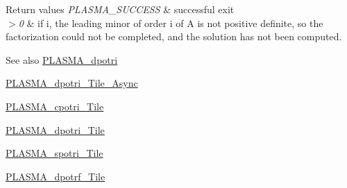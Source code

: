 \begin{DoxyRetVals}{Return values}
{\em P\+L\+A\+S\+M\+A\+\_\+\+S\+U\+C\+C\+E\+S\+S} & successful exit \\
\hline
{\em $>$0} & if i, the leading minor of order i of A is not positive definite, so the factorization could not be completed, and the solution has not been computed.\\
\hline
\end{DoxyRetVals}
\begin{DoxySeeAlso}{See also}
\hyperlink{group__double_ga01b70786730b5e4c314b4584fe3697c5_ga01b70786730b5e4c314b4584fe3697c5}{P\+L\+A\+S\+M\+A\+\_\+dpotri} 

\hyperlink{group__double__Tile__Async_gafa039c73de9ebc0ec6308256b773a05a_gafa039c73de9ebc0ec6308256b773a05a}{P\+L\+A\+S\+M\+A\+\_\+dpotri\+\_\+\+Tile\+\_\+\+Async} 

\hyperlink{group__PLASMA__Complex32__t__Tile_gaceabc04acf5032a6a9e0415cab2e5abe_gaceabc04acf5032a6a9e0415cab2e5abe}{P\+L\+A\+S\+M\+A\+\_\+cpotri\+\_\+\+Tile} 

\hyperlink{group__double__Tile_gab78b1dc223af4cceea99502e98e9fb72_gab78b1dc223af4cceea99502e98e9fb72}{P\+L\+A\+S\+M\+A\+\_\+dpotri\+\_\+\+Tile} 

\hyperlink{group__float__Tile_ga3f2b23232748f3fde3e58d06757af2ff_ga3f2b23232748f3fde3e58d06757af2ff}{P\+L\+A\+S\+M\+A\+\_\+spotri\+\_\+\+Tile} 

\hyperlink{group__double__Tile_ga6fde33d873bc6ad52b7c0c63ccc669ab_ga6fde33d873bc6ad52b7c0c63ccc669ab}{P\+L\+A\+S\+M\+A\+\_\+dpotrf\+\_\+\+Tile} 
\end{DoxySeeAlso}
\hypertarget{group__double__Tile_ga07a5a6b08e66c1a66da7845f99a86a21_ga07a5a6b08e66c1a66da7845f99a86a21}{}
